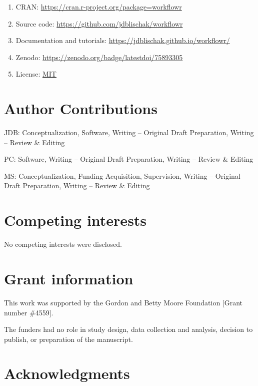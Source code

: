 \documentclass[9pt,a4paper]{extarticle}
\begin{document}
\begin{enumerate}

\item CRAN: \url{https://cran.r-project.org/package=workflowr}

\item Source code: \url{https://github.com/jdblischak/workflowr}

\item Documentation and tutorials:
\url{https://jdblischak.github.io/workflowr/}

\item Zenodo: \url{https://zenodo.org/badge/latestdoi/75893305}

\item License: \href{https://choosealicense.com/licenses/mit}{MIT}

\end{enumerate}


\section*{Author Contributions}

JDB: Conceptualization, Software, Writing – Original Draft Preparation,
Writing – Review \& Editing

PC: Software, Writing – Original Draft Preparation, Writing – Review \&
Editing

MS: Conceptualization, Funding Acquisition, Supervision, Writing –
Original Draft Preparation, Writing – Review \& Editing


\section*{Competing interests}

No competing interests were disclosed.


\section*{Grant information}

This work was supported by the Gordon and Betty Moore Foundation [Grant
number \#4559].

The funders had no role in study design, data collection and analysis,
decision to publish, or preparation of the manuscript.


\section*{Acknowledgments}
\end{document}
